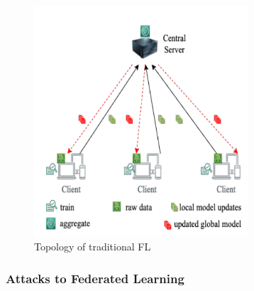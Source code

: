 \documentclass{article}
\begin{document}
\begin{figure}[!ht]
    \centering
    \includegraphics[width=8cm]{assets/topologyFL.PNG}
    \caption{Topology of traditional FL}
    \label{fig:TopologyFL}
\end{figure}

\subsubsection{Attacks to Federated Learning}
\end{document}
